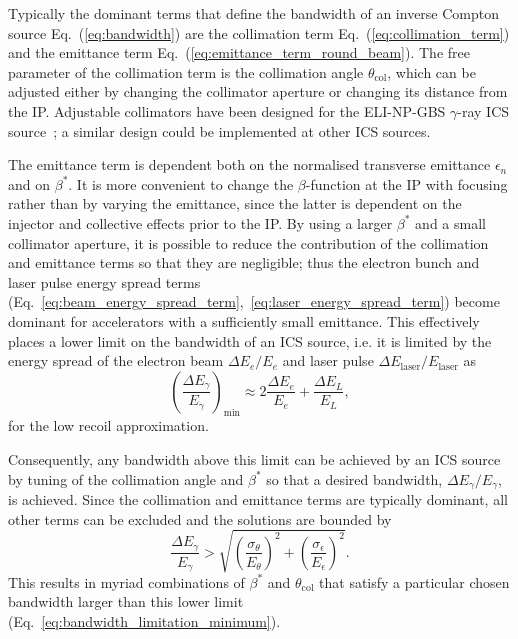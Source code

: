 \documentclass[../main.tex]{subfiles}
\begin{document}
Typically the dominant terms that define the bandwidth of an inverse Compton source Eq.~(\ref{eq:bandwidth}) are the collimation term Eq.~(\ref{eq:collimation_term}) and the emittance term Eq.~(\ref{eq:emittance_term_round_beam}). The free parameter of the collimation term is the collimation angle $\theta_{\mathrm{col}}$, which can be adjusted either by changing the collimator aperture or changing its distance from the IP. Adjustable collimators have been designed for the ELI-NP-GBS $\gamma$-ray ICS source~\cite{paterno2017collimation}; a similar design could be implemented at other ICS sources.

The emittance term is dependent both on the normalised transverse emittance $\epsilon_{n}$ and on $\beta^{*}$. It is more convenient to change the $\beta$-function at the IP with focusing rather than by varying the emittance, since the latter is dependent on the injector and collective effects prior to the IP. By using a larger $\beta^{*}$ and a small collimator aperture, it is possible to reduce the contribution of the collimation and emittance terms so that they are negligible; thus the electron bunch and laser pulse energy spread terms (Eq.~\ref{eq:beam_energy_spread_term},~\ref{eq:laser_energy_spread_term}) become dominant for accelerators with a sufficiently small emittance. This effectively places a lower limit on the bandwidth of an ICS source, i.e. it is limited by the energy spread of the electron beam $\Delta E_{e}/E_{e}$ and laser pulse $\Delta E_{\mathrm{laser}}/E_{\mathrm{laser}}$ as 
\begin{equation}
\left(\frac{\Delta E_{\gamma}}{E_{\gamma}}\right)_{\mathrm{min}} \approx 2 \frac{\Delta E_{e}}{E_{e}} + \frac{\Delta E_{L}}{E_{L}},
\label{eq:bandwidth_limitation_minimum}
\end{equation}
for the low recoil approximation.

Consequently, any bandwidth above this limit can be achieved by an ICS source by tuning of the collimation angle and $\beta^*$ so that a desired bandwidth, $\Delta E_{\gamma}/E_{\gamma}$, is achieved. Since the collimation and emittance terms are typically dominant, all other terms can be excluded and the solutions are bounded by
\begin{equation}
\frac{\Delta E_{\gamma}}{E_{\gamma}} > \sqrt{\left(\frac{ \sigma_{\theta}}{E_{\theta}}\right)^{2}+\left(\frac{\sigma_{\epsilon}}{E_{\epsilon}}\right)^{2}}.    
\end{equation}
This results in myriad combinations of $\beta^{*}$ and $\theta_{\mathrm{col}}$ that satisfy a particular chosen bandwidth larger than this lower limit (Eq.~\ref{eq:bandwidth_limitation_minimum}).
\end{document}
